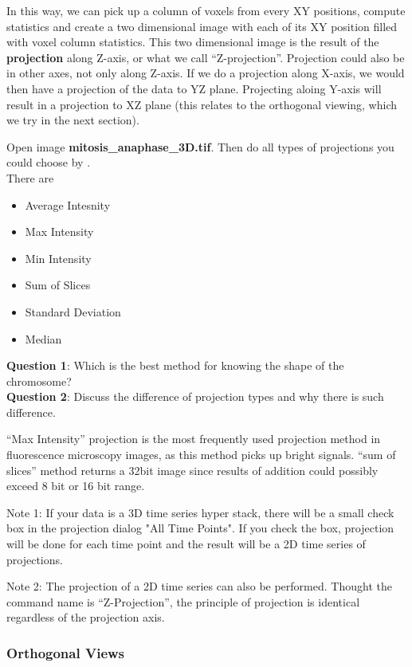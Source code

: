 In this way, we can pick up a column of voxels from every XY positions, compute statistics and create a two dimensional image with each of its XY position filled with voxel column statistics. This two dimensional image is the result of the \textbf{projection} along Z-axis, or what we call ``Z-projection''. Projection could also be in other axes, not only along Z-axis. If we do a projection along X-axis, we would then have a projection of the data to YZ plane. Projecting aloing Y-axis will result in a projection to XZ plane (this relates to the orthogonal viewing, which we try in the next section).

\begin{indentexercise}{2}
Open image \textbf{mitosis\_anaphase\_3D.tif}.
Then do all types of projections you could choose by .\\
There are 
\begin{itemize}
\item Average Intesnity
\item Max Intensity
\item Min Intensity
\item Sum of Slices
\item Standard Deviation
\item Median
\end{itemize}

\textbf{Question 1}: Which is the best method for knowing the shape of the chromosome?\\
\textbf{Question 2}: Discuss the difference of projection types and why there is such difference.  
\end{indentexercise}

``Max Intensity'' projection is the most frequently used projection method in fluorescence microscopy images, as this method picks up bright signals. ``sum of slices'' method returns a 32bit image since results of addition could possibly exceed 8 bit or 16 bit range. 

Note 1: If your data is a 3D time series hyper stack, there will be a small check box in the projection dialog "All Time Points". If you check the box, projection will be done for each time point and the result will be a 2D time series of projections.

Note 2: The projection of a 2D time series can also be performed. Thought the command name is ``Z-Projection'', the principle of projection is identical regardless of the projection axis.  

\subsubsection{Orthogonal Views}

